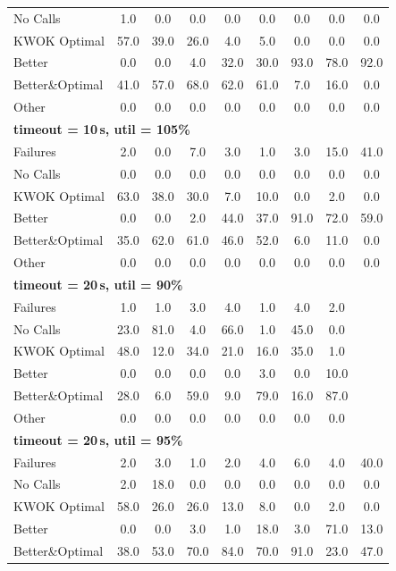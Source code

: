 \begin{tabular}{l cccccccc}
No Calls & 1.0 & 0.0 & 0.0 & 0.0 & 0.0 & 0.0 & 0.0 & 0.0 \\
KWOK Optimal & 57.0 & 39.0 & 26.0 & 4.0 & 5.0 & 0.0 & 0.0 & 0.0 \\
Better & 0.0 & 0.0 & 4.0 & 32.0 & 30.0 & 93.0 & 78.0 & 92.0 \\
Better\&Optimal & 41.0 & 57.0 & 68.0 & 62.0 & 61.0 & 7.0 & 16.0 & 0.0 \\
Other & 0.0 & 0.0 & 0.0 & 0.0 & 0.0 & 0.0 & 0.0 & 0.0 \\
\midrule
\multicolumn{9}{l}{\textbf{timeout = 10\,s, util = 105\%}} \\
\midrule
Failures & 2.0 & 0.0 & 7.0 & 3.0 & 1.0 & 3.0 & 15.0 & 41.0 \\
No Calls & 0.0 & 0.0 & 0.0 & 0.0 & 0.0 & 0.0 & 0.0 & 0.0 \\
KWOK Optimal & 63.0 & 38.0 & 30.0 & 7.0 & 10.0 & 0.0 & 2.0 & 0.0 \\
Better & 0.0 & 0.0 & 2.0 & 44.0 & 37.0 & 91.0 & 72.0 & 59.0 \\
Better\&Optimal & 35.0 & 62.0 & 61.0 & 46.0 & 52.0 & 6.0 & 11.0 & 0.0 \\
Other & 0.0 & 0.0 & 0.0 & 0.0 & 0.0 & 0.0 & 0.0 & 0.0 \\
\midrule
\multicolumn{9}{l}{\textbf{timeout = 20\,s, util = 90\%}} \\
\midrule
Failures & 1.0 & 1.0 & 3.0 & 4.0 & 1.0 & 4.0 & 2.0 & \text{--} \\
No Calls & 23.0 & 81.0 & 4.0 & 66.0 & 1.0 & 45.0 & 0.0 & \text{--} \\
KWOK Optimal & 48.0 & 12.0 & 34.0 & 21.0 & 16.0 & 35.0 & 1.0 & \text{--} \\
Better & 0.0 & 0.0 & 0.0 & 0.0 & 3.0 & 0.0 & 10.0 & \text{--} \\
Better\&Optimal & 28.0 & 6.0 & 59.0 & 9.0 & 79.0 & 16.0 & 87.0 & \text{--} \\
Other & 0.0 & 0.0 & 0.0 & 0.0 & 0.0 & 0.0 & 0.0 & \text{--} \\
\midrule
\multicolumn{9}{l}{\textbf{timeout = 20\,s, util = 95\%}} \\
\midrule
Failures & 2.0 & 3.0 & 1.0 & 2.0 & 4.0 & 6.0 & 4.0 & 40.0 \\
No Calls & 2.0 & 18.0 & 0.0 & 0.0 & 0.0 & 0.0 & 0.0 & 0.0 \\
KWOK Optimal & 58.0 & 26.0 & 26.0 & 13.0 & 8.0 & 0.0 & 2.0 & 0.0 \\
Better & 0.0 & 0.0 & 3.0 & 1.0 & 18.0 & 3.0 & 71.0 & 13.0 \\
Better\&Optimal & 38.0 & 53.0 & 70.0 & 84.0 & 70.0 & 91.0 & 23.0 & 47.0 \\

\end{tabular}
